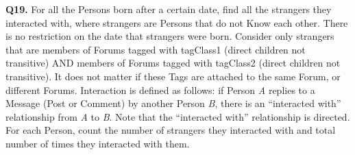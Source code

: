 \textbf{Q19.}
For all the Persons born after a certain date, find all the strangers
they interacted with, where strangers are Persons that do not Know each
other. There is no restriction on the date that strangers were born.
Consider only strangers that are members of Forums tagged with tagClass1
(direct children not transitive) AND members of Forums tagged with
tagClass2 (direct children not transitive). It does not matter if these
Tags are attached to the same Forum, or different Forums.
Interaction is defined as follows: if Person \emph{A} replies to a
Message (Post or Comment) by another Person \emph{B}, there is an
``interacted with'' relationship from \emph{A} to \emph{B}. Note that
the ``interacted with'' relationship is directed.
For each Person, count the number of strangers they interacted with and
total number of times they interacted with them.
